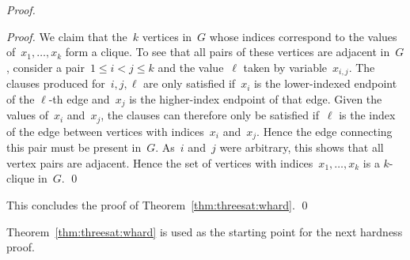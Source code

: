 \let\accentvec\vec  \documentclass{llncs}
\newcommand{\claimqed}{\renewcommand{\squareforqed}{$\lrcorner$}\qed\renewcommand{\squareforqed}{\plainsquareforqed}}
\begin{document}
\begin{proof}
\begin{proof}
We claim that the~$k$ vertices in~$G$ whose indices correspond to the values of~$x_1, \ldots, x_k$ form a clique. To see that all pairs of these vertices are adjacent in~$G$, consider a pair~$1 \leq i < j \leq k$ and the value~$\ell$ taken by variable~$x_{i,j}$. The clauses produced for~$i,j,\ell$ are only satisfied if~$x_i$ is the lower-indexed endpoint of the $\ell$-th edge and~$x_j$ is the higher-index endpoint of that edge. Given the values of~$x_i$ and~$x_j$, the clauses can therefore only be satisfied if~$\ell$ is the index of the edge between vertices with indices~$x_i$ and~$x_j$. Hence the edge connecting this pair must be present in~$G$. As~$i$ and~$j$ were arbitrary, this shows that all vertex pairs are adjacent. Hence the set of vertices with indices~$x_1, \ldots, x_k$ is a $k$-clique in~$G$.
\claimqed
\end{proof}

This concludes the proof of Theorem~\ref{thm:threesat:whard}.
\qed
\end{proof}


Theorem~\ref{thm:threesat:whard} is used as the starting point for the next hardness proof.
\end{document}
